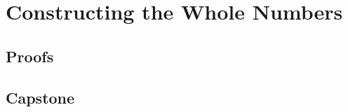 \chapter{Constructing the Whole Numbers}
\label{chap:whole-numbers}




\LRAExcludeFromPrintEditionBegin
\section*{Proofs}


\section*{Capstone}

\LRAExcludeFromPrintEditionEnd
